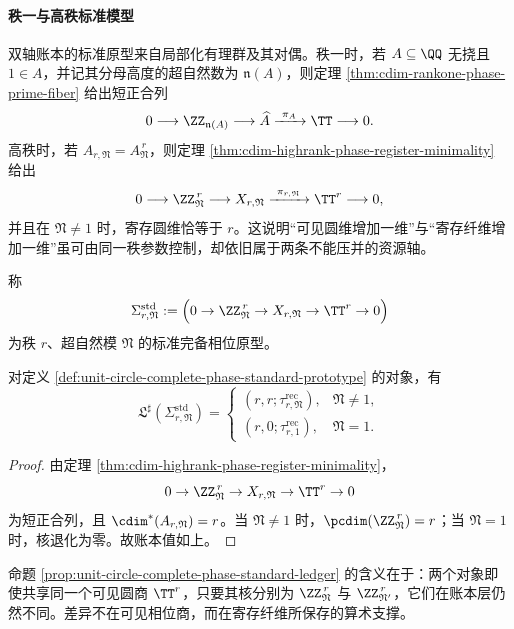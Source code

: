 \paragraph{秩一与高秩标准模型}
双轴账本的标准原型来自局部化有理群及其对偶。秩一时，若 \(A\subseteq\QQ\) 无挠且 \(1\in A\)，并记其分母高度的超自然数为 \(\mathfrak n(A)\)，则定理 \ref{thm:cdim-rankone-phase-prime-fiber} 给出短正合列
\[
0\longrightarrow \ZZ_{\mathfrak n(A)}
\longrightarrow \widehat A
\xrightarrow{\ \pi_A\ }
\TT
\longrightarrow 0.
\]
高秩时，若 \(A_{r,\mathfrak N}=A_{\mathfrak N}^{\,r}\)，则定理 \ref{thm:cdim-highrank-phase-register-minimality} 给出
\[
0\longrightarrow \ZZ_{\mathfrak N}^{\,r}
\longrightarrow X_{r,\mathfrak N}
\xrightarrow{\ \pi_{r,\mathfrak N}\ }
\TT^r
\longrightarrow 0,
\]
并且在 \(\mathfrak N\neq 1\) 时，寄存圆维恰等于 \(r\)。这说明“可见圆维增加一维”与“寄存纤维增加一维”虽可由同一秩参数控制，却依旧属于两条不能压并的资源轴。

\begin{definition}[标准双轴原型]\label{def:unit-circle-complete-phase-standard-prototype}
称
\[
\Sigma^{\mathrm{std}}_{r,\mathfrak N}
:=
\Bigl(
0\to \ZZ_{\mathfrak N}^{\,r}\to X_{r,\mathfrak N}\to \TT^r\to 0
\Bigr)
\]
为秩 \(r\)、超自然模 \(\mathfrak N\) 的标准完备相位原型。
\end{definition}

\begin{proposition}[标准原型的账本值]\label{prop:unit-circle-complete-phase-standard-ledger}
对定义 \ref{def:unit-circle-complete-phase-standard-prototype} 的对象，有
\[
\mathfrak L^\sharp(\Sigma^{\mathrm{std}}_{r,\mathfrak N})
=
\begin{cases}
(r,r;\tau^{\mathrm{rec}}_{r,\mathfrak N}), & \mathfrak N\neq 1,\\[4pt]
(r,0;\tau^{\mathrm{rec}}_{r,1}), & \mathfrak N=1.
\end{cases}
\]
\end{proposition}
\begin{proof}
由定理 \ref{thm:cdim-highrank-phase-register-minimality}，
\[
0\to \ZZ_{\mathfrak N}^{\,r}\to X_{r,\mathfrak N}\to \TT^r\to 0
\]
为短正合列，且 \(\cdim^\ast(A_{r,\mathfrak N})=r\)。当 \(\mathfrak N\neq 1\) 时，\(\pcdim(\ZZ_{\mathfrak N}^{\,r})=r\)；当 \(\mathfrak N=1\) 时，核退化为零。故账本值如上。
\end{proof}

命题 \ref{prop:unit-circle-complete-phase-standard-ledger} 的含义在于：两个对象即使共享同一个可见圆商 \(\TT^r\)，只要其核分别为 \(\ZZ_{\mathfrak N}^{\,r}\) 与 \(\ZZ_{\mathfrak N'}^{\,r}\)，它们在账本层仍然不同。差异不在可见相位商，而在寄存纤维所保存的算术支撑。

